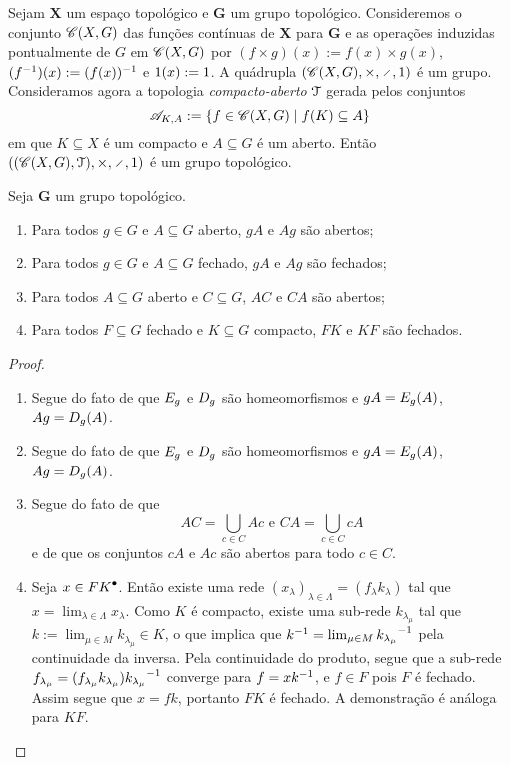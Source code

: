 \begin{example}
Sejam $\bm X$ um espaço topológico e $\bm G$ um grupo topológico. Consideremos o conjunto $\mathscr{C}(X,G)$ das funções contínuas de $\bm X$ para $\bm G$ e as operações induzidas pontualmente de $G$ em $\mathscr{C}(X,G)$ por $(f \times g)(x) := f(x) \times g(x)$, $(f^{-1})(x) := (f(x))^{-1}$ e $1(x) := 1$. A quádrupla $(\Cont(X,G),\times,\div,\id)$ é um grupo. Consideramos agora a topologia \emph{compacto-aberto} $\mathcal{T}$ gerada pelos conjuntos
	\begin{equation*}
	\mathscr A_{K,A} := \left\{{f \in \mathscr{C}(X,G)}\;\middle\vert\;{f(K) \subseteq A}\right\}
	\end{equation*}
em que $K \subseteq X$ é um compacto e $A \subseteq G$ é um aberto. Então $((\Cont(X,G),\topo),\times,\div,\id)$ é um grupo topológico.
\end{example}

\begin{proposition}
Seja $\bm G$ um grupo topológico.
	\begin{enumerate}
	\item Para todos $g \in G$ e $A \subseteq G$ aberto, $gA$ e $Ag$ são abertos;
	\item Para todos $g \in G$ e $A \subseteq G$ fechado, $gA$ e $Ag$ são fechados;
	\item Para todos $A \subseteq G$ aberto e $C \subseteq G$, $AC$ e $CA$ são abertos;
	\item Para todos $F \subseteq G$ fechado e $K \subseteq G$ compacto, $FK$ e $KF$ são fechados.
	\end{enumerate}
\end{proposition}
\begin{proof}
	\begin{enumerate}
	\item Segue do fato de que $E_{g}$ e $D_{g}$ são homeomorfismos e $gA = E_{g}(A)$, $Ag = D_{g}(A)$.
	\item Segue do fato de que $E_{g}$ e $D_{g}$ são homeomorfismos e $gA = E_{g}(A)$, $Ag = D_{g}(A)$.
	\item Segue do fato de que
		\begin{equation*}
		AC = \bigcup_{c \in C} Ac \text{\ \ e\ \ } CA = \bigcup_{c \in C} cA
		\end{equation*}
e de que os conjuntos $cA$ e $Ac$ são abertos para todo $c \in C$.
	\item Seja $x \in {FK}^\bullet$. Então existe uma rede $(x_\lambda)_{\lambda \in \Lambda} = (f_\lambda k_\lambda)$ tal que $x = \lim_{\lambda \in \Lambda} x_\lambda$. Como $K$ é compacto, existe uma sub-rede $k_{\lambda_\mu}$ tal que $k := \lim_{\mu \in M} k_{\lambda_\mu} \in K$, o que implica que $k^{-1} = \lim_{\mu \in M} {k_{\lambda_\mu}}^{-1}$ pela continuidade da inversa. Pela continuidade do produto, segue que a sub-rede $f_{\lambda_\mu} = (f_{\lambda_\mu}k_{\lambda_\mu}){k_{\lambda_\mu}}^{-1}$ converge para $f = xk^{-1}$, e $f \in F$ pois $F$ é fechado. Assim segue que $x=fk$, portanto $FK$ é fechado. A demonstração é análoga para $KF$.
	\end{enumerate}
\end{proof}

